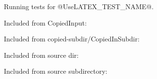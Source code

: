 \documentclass{article}
\begin{document}
Running tests for @UseLATEX_TEST_NAME@.

Included from CopiedInput:


Included from copied-subdir/CopiedInSubdir:


Included from source dir:


Included from source subdirectory:

\end{document}
